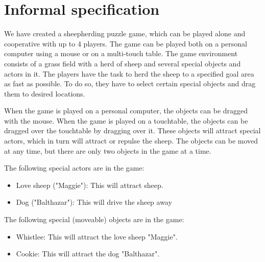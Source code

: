 \documentclass[a4paper,10pt]{report}
\begin{document}
\section{Informal specification}
We have created a sheepherding puzzle game, which can be played alone and cooperative with up to 4 players.
The game can be played both on a personal computer using a mouse or on a multi-touch table.
The game environment consists of a grass field with a herd of sheep and several special objects and actors in it.
The players have the task to herd the sheep to a specified goal area as fast as possible.
To do so, they have to select certain special objects and drag them to desired locations.

When the game is played on a personal computer, the objects can be dragged with the mouse. 
When the game is played on a touchtable, the objects can be dragged over the touchtable by dragging over it.
These objects will attract special actors, which in turn will attract or repulse the sheep.
The objects can be moved at any time, but there are only two objects in the game at a time.

The following special actors are in the game: \\

\begin{itemize}

\item
	Love sheep ("Maggie"): This will attract sheep.
\item
	Dog ("Balthazar"): This will drive the sheep away \\
\end{itemize}
The following special (moveable) objects are in the game:\\
\begin{itemize}
\item
	Whistlee: This will attract the love sheep "Maggie".
\item
Cookie: This will attract the dog "Balthazar".\\
\end{itemize}
\end{document}

